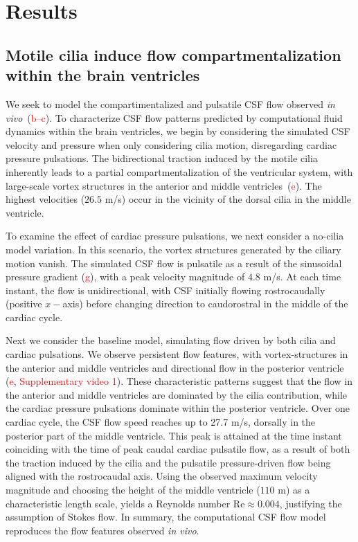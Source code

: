 \documentclass[fleqn]{wlscirep}
\newcommand{\fixme}[1]{\textcolor{red}{#1}}
\begin{document}
\section*{Results}

\subsection*{Motile cilia induce flow compartmentalization within the brain ventricles}

We seek to model the compartimentalized and pulsatile CSF flow observed \emph{in vivo}~(\fixme{b--c}).
To characterize CSF flow patterns predicted by
computational fluid dynamics within the brain ventricles, we begin by
considering the simulated CSF velocity and pressure when only considering
cilia motion, disregarding cardiac pressure pulsations. The
bidirectional traction induced by the motile cilia
inherently leads to a partial compartmentalization of the ventricular
system, with large-scale vortex structures in the anterior and middle
ventricles~(\fixme{e}). The highest velocities ($26.5$ \textmu m/s)
occur in the vicinity of the dorsal cilia in the middle ventricle. 

To examine the effect of cardiac pressure pulsations,
we next consider a no-cilia model variation. In this scenario, the vortex structures
generated by the ciliary motion vanish. The simulated CSF
flow is pulsatile as a result of the sinusoidal pressure gradient (\fixme{g}),
with a peak velocity magnitude of $4.8$ \textmu m/s. At each time instant, the flow
is unidirectional, with CSF initially flowing rostrocaudally (positive $x-$axis) before changing
direction to caudorostral in the middle of the cardiac cycle.

Next we consider the baseline model, simulating flow driven by both cilia
and cardiac pulsations. We observe persistent flow features,
with vortex-structures in the anterior and middle ventricles
and directional flow in the posterior ventricle (\fixme{e},
\fixme{Supplementary video 1}). These characteristic patterns suggest
that the flow in the anterior and middle ventricles are dominated by
the cilia contribution, while the cardiac pressure pulsations dominate
within the posterior ventricle. Over one cardiac cycle, the CSF flow
speed reaches up to 27.7 \textmu m/s, dorsally in the posterior part
of the middle ventricle. This peak is attained at the time instant
coinciding with the time of peak caudal cardiac pulsatile flow, as a
result of both the traction induced by the cilia and the pulsatile
pressure-driven flow being aligned with the rostrocaudal 
axis. Using the observed maximum velocity magnitude and choosing the height of
the middle ventricle ($110$ \textmu m) as a characteristic length
scale, yields a Reynolds number $\mathrm{Re} \approx 0.004$,
justifying the assumption of Stokes flow. In summary, the computational
CSF flow model reproduces the flow features observed \emph{in vivo}.
\end{document}
